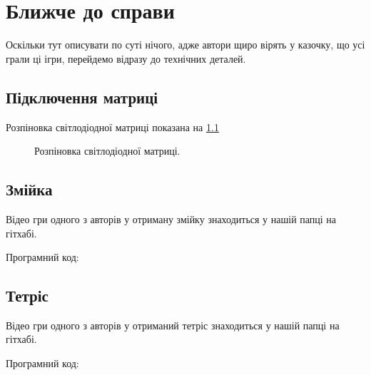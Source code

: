 \chapter{Ближче до справи} 
\label{chapter:first}

Оскільки тут описувати по суті нічого, адже автори щиро вірять у казочку, що усі грали ці ігри, перейдемо відразу до технічних деталей.

\section{Підключення матриці}

Розпіновка світлодіодної матриці показана на \ref{matrix}
\begin{figure}[h]
\caption{Розпіновка світлодіодної матриці.}
\label{matrix}
\end{figure}

\section{Змійка}

Відео гри одного з авторів у отриману змійку знаходиться у нашій папці на гітхабі.

Програмний код: 



\section{Тетріс}

Відео гри одного з авторів у отриманий тетріс знаходиться у нашій папці на гітхабі.

Програмний код: 

